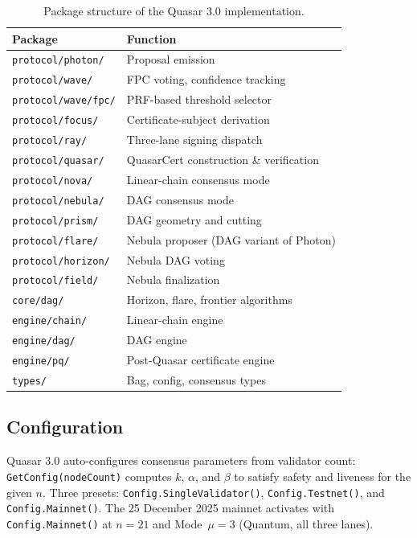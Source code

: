 \begin{table}[ht]
\centering
\small
\begin{tabular}{@{}ll@{}}
\toprule
\textbf{Package} & \textbf{Function} \\
\midrule
\texttt{protocol/photon/}  & Proposal emission \\
\texttt{protocol/wave/}    & FPC voting, confidence tracking \\
\texttt{protocol/wave/fpc/} & PRF-based threshold selector \\
\texttt{protocol/focus/}   & Certificate-subject derivation \\
\texttt{protocol/ray/}     & Three-lane signing dispatch \\
\texttt{protocol/quasar/}  & QuasarCert construction \& verification \\
\texttt{protocol/nova/}    & Linear-chain consensus mode \\
\texttt{protocol/nebula/}  & DAG consensus mode \\
\texttt{protocol/prism/}   & DAG geometry and cutting \\
\texttt{protocol/flare/}   & Nebula proposer (DAG variant of Photon) \\
\texttt{protocol/horizon/} & Nebula DAG voting \\
\texttt{protocol/field/}   & Nebula finalization \\
\texttt{core/dag/}         & Horizon, flare, frontier algorithms \\
\texttt{engine/chain/}     & Linear-chain engine \\
\texttt{engine/dag/}       & DAG engine \\
\texttt{engine/pq/}        & Post-Quasar certificate engine \\
\texttt{types/}            & Bag, config, consensus types \\
\bottomrule
\end{tabular}
\caption{Package structure of the Quasar 3.0 implementation.}
\label{tab:packages}
\end{table}

\subsection{Configuration}

Quasar 3.0 auto-configures consensus parameters from validator count:
\texttt{GetConfig(nodeCount)} computes $k$, $\alpha$, and $\beta$ to
satisfy safety and liveness for the given $n$. Three presets:
\texttt{Config.SingleValidator()}, \texttt{Config.Testnet()}, and
\texttt{Config.Mainnet()}. The 25 December 2025 mainnet activates with
\texttt{Config.Mainnet()} at $n=21$ and Mode~$\mu = 3$ (Quantum, all
three lanes).


